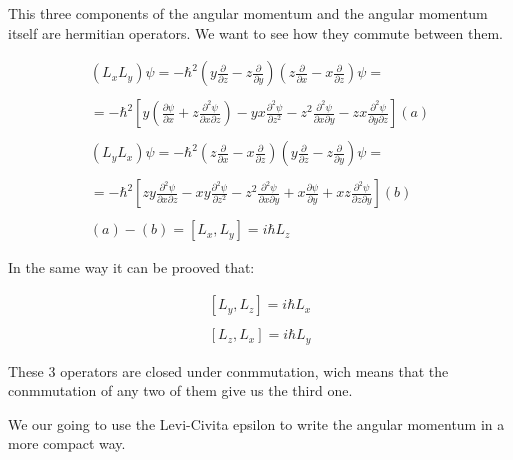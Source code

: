 This three components of the angular momentum and the angular momentum itself are hermitian operators. We want to see how they commute between them.

\begin{equation}
  \begin{array}{c}
  (L_xL_y) \psi = -\hbar^2 (y \frac{\partial}{\partial z} - z \frac{\partial}{\partial y})(z \frac{\partial}{\partial x} - x \frac{\partial}{\partial z}) \psi =
  \\

  \\
  = -\hbar^2 \left[y\left(\frac{\partial \psi}{\partial x}+z\frac{\partial^2\psi}{\partial x \partial z}\right)-yx\frac{\partial^2 \psi}{\partial z^2}-z^2 \frac{\partial^2 \psi}{\partial x \partial y}-zx\frac{\partial^2 \psi}{\partial y \partial z}\right] (a)
  \\

  \\
  (L_y L_x) \psi = -\hbar^2 (z \frac{\partial}{\partial x} - x \frac{\partial}{\partial z})(y \frac{\partial}{\partial z} - z \frac{\partial}{\partial y}) \psi =
  \\

  \\
  = -\hbar^2 \left[zy\frac{\partial^2\psi}{\partial x\partial z}-xy\frac{\partial^2\psi}{\partial z^2}-z^2\frac{\partial^2 \psi}{\partial x \partial y}+x\frac{\partial \psi}{\partial y}+xz\frac{\partial^2 \psi}{\partial z \partial y}\right] (b)
  \\

  \\
  (a)-(b) = [L_x,L_y] =i\hbar L_z
  \end{array}
\end{equation}

In the same way it can be prooved that:

\begin{equation}
  \begin{array}{c}
  \left[L_y,L_z\right] =i\hbar L_x
  \\

  \\
  \left[L_z,L_x\right] =i\hbar L_y
  \end{array}
\end{equation}

These 3 operators are closed under conmmutation, wich means that the conmmutation of any two of them give us the third one.

We our going to use the Levi-Civita epsilon to write the angular momentum in a more compact way.

